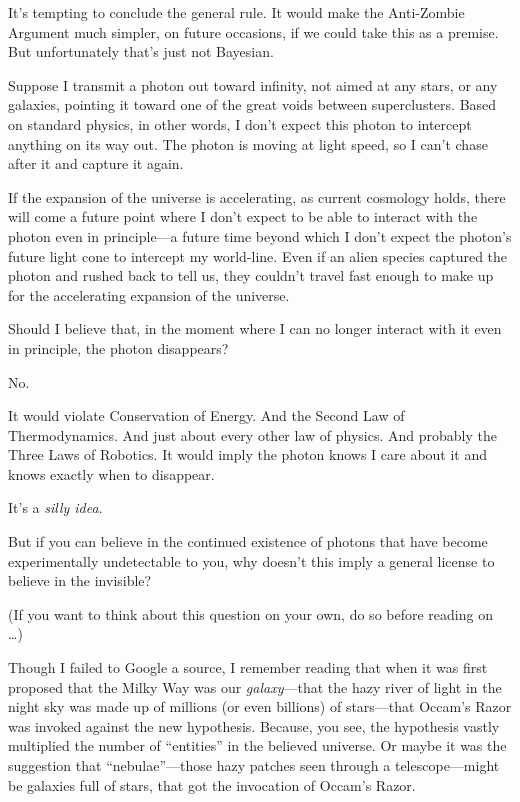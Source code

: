 {
 It's tempting to conclude the general rule. It
would make the Anti-Zombie Argument much simpler, on future occasions,
if we could take this as a premise. But unfortunately
that's just not Bayesian.}

{
 Suppose I transmit a photon out toward infinity, not aimed at any
stars, or any galaxies, pointing it toward one of the great voids
between superclusters. Based on standard physics, in other words, I
don't expect this photon to intercept anything on its
way out. The photon is moving at light speed, so I
can't chase after it and capture it again.}

{
 If the expansion of the universe is accelerating, as current
cosmology holds, there will come a future point where I
don't expect to be able to interact with the photon
even in principle---a future time beyond which I don't
expect the photon's future light cone to intercept my
world-line. Even if an alien species captured the photon and rushed
back to tell us, they couldn't travel fast enough to
make up for the accelerating expansion of the universe.}

{
 Should I believe that, in the moment where I can no longer
interact with it even in principle, the photon disappears?}

{
 No.}

{
 It would violate Conservation of Energy. And the Second Law of
Thermodynamics. And just about every other law of physics. And probably
the Three Laws of Robotics. It would imply the photon knows I care
about it and knows exactly when to disappear.}

{
 It's a \textit{silly idea}.}

{
 But if you can believe in the continued existence of photons that
have become experimentally undetectable to you, why
doesn't this imply a general license to believe in the
invisible?}

{
 (If you want to think about this question on your own, do so
before reading on \ldots)}

{
 Though I failed to Google a source, I remember reading that when
it was first proposed that the Milky Way was our
\textit{galaxy}{}---that the hazy river of light in the night sky was
made up of millions (or even billions) of stars---that
Occam's Razor was invoked against the new hypothesis.
Because, you see, the hypothesis vastly multiplied the number of
``entities'' in the believed
universe. Or maybe it was the suggestion that
``nebulae''---those hazy patches
seen through a telescope---might be galaxies full of stars, that got
the invocation of Occam's Razor.}

